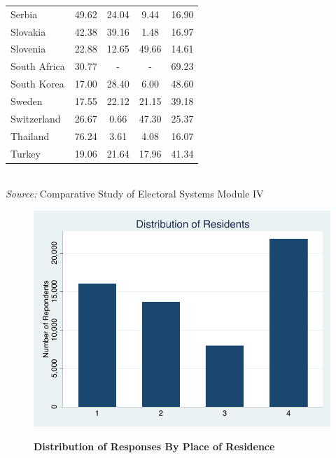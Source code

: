 \documentclass[12pt, titlepage]{article}
\newcommand\e{\emph}
\newcommand\tb{\textbf}
\begin{document}
\begin{table}[h!]
\begin{tabulary}{\linewidth}{l c c c c}
		Serbia&49.62&24.04&9.44&16.90 \\
		Slovakia&42.38&39.16&1.48&16.97 \\
		Slovenia&22.88&12.65&49.66&14.61 \\
		South Africa&30.77&-&-&69.23 \\
		South Korea&17.00&28.40&6.00&48.60 \\
		Sweden&17.55&22.12&21.15&39.18 \\
		Switzerland&26.67&0.66&47.30&25.37 \\
		Thailand&76.24&3.61&4.08&16.07 \\
		Turkey&19.06&21.64&17.96&41.34 \\
		\hline
	\end{tabulary} \\
\e{Source:} Comparative Study of Electoral Systems Module IV 
\label{table2}
\end{table}

\begin{figure}[ht!]    \centering
	{	 \includegraphics[width=\textwidth]{Residents}}
	\caption{\tb{Distribution of Responses By Place of Residence}}\label{figure1}
\end{figure}
\end{document}
